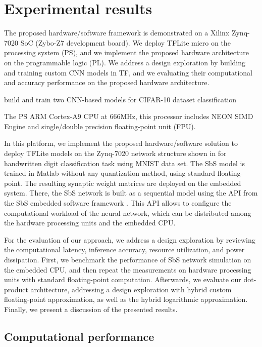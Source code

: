 \section{Experimental results}
\label{sec:experimental_results}
The proposed hardware/software framework is demonstrated on a Xilinx Zynq-7020 SoC (Zybo-Z7 development board). We deploy TFLite micro on the processing system (PS), and we implement the proposed hardware architecture on the programmable logic (PL). We address a design exploration by building and training custom CNN models in TF, and we evaluating their computational and accuracy performance on the proposed hardware architecture.

build and train two CNN-based models for CIFAR-10 dataset classification

The PS ARM Cortex-A9 CPU at 666MHz, this processor includes NEON SIMD Engine and single/double precision floating-point unit (FPU)\cite{xilinx2015zynq}.

In this platform, we implement the proposed hardware/software solution to deploy TFLite models on the Zynq-7020 network structure shown in  for handwritten digit classification task using MNIST data set. The SbS model is trained in Matlab without any quantization method, using standard floating-point. The resulting synaptic weight matrices are deployed on the embedded system. There, the SbS network is built as a sequential model using the API from the SbS embedded software framework \cite{nevarez2020accelerator}. This API allows to configure the computational workload of the neural network, which can be distributed among the hardware processing units and the embedded CPU.

For the evaluation of our approach, we address a design exploration by reviewing the computational latency, inference accuracy, resource utilization, and power dissipation. First, we benchmark the performance of SbS network simulation on the embedded CPU, and then repeat the measurements on hardware processing units with standard floating-point computation. Afterwards, we evaluate our dot-product architecture, addressing a design exploration with hybrid custom floating-point approximation, as well as the hybrid logarithmic approximation. Finally, we present a discussion of the presented results.

\subsection{Computational performance}
